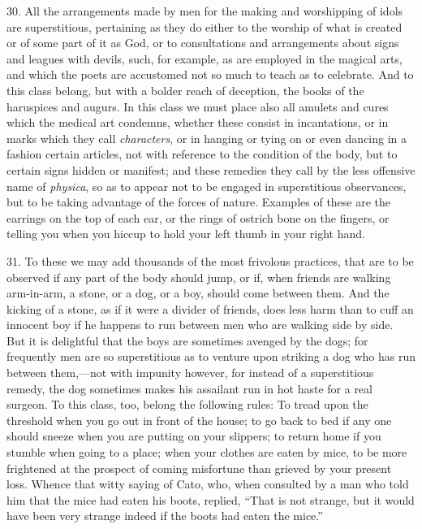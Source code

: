 30. All the arrangements made by men for the making and worshipping of idols are superstitious, pertaining as they do either to the worship of what is created or of some part of it as God, or to consultations and arrangements about signs and leagues with devils, such, for example, as are employed in the magical arts, and which the poets are accustomed not so much to teach as to celebrate. And to this class belong, but with a bolder reach of deception, the books of the haruspices and augurs. In this class we must place also all amulets and cures which the medical art condemns, whether these consist in incantations, or in marks which they call \emph{characters}, or in hanging or tying on or even dancing in a fashion certain articles, not with reference to the condition of the body, but to certain signs hidden or manifest; and these remedies they call by the less offensive name of \emph{physica}, so as to appear not to be engaged in superstitious observances, but to be taking advantage of the forces of nature. Examples of these are the earrings on the top of each ear, or the rings of ostrich bone on the fingers, or telling you when you hiccup to hold your left thumb in your right hand.

31. To these we may add thousands of the most frivolous practices, that are to be observed if any part of the body should jump, or if, when friends are walking arm-in-arm, a stone, or a dog, or a boy, should come between them. And the kicking of a stone, as if it were a divider of friends, does less harm than to cuff an innocent boy if he happens to run between men who are walking side by side. But it is delightful that the boys are sometimes avenged by the dogs; for frequently men are so superstitious as to venture upon striking a dog who has run between them,—not with impunity however, for instead of a superstitious remedy, the dog sometimes makes his assailant run in hot haste for a real surgeon. To this class, too, belong the following rules: To tread upon the threshold when you go out in front of the house; to go back to bed if any one should sneeze when you are putting on your slippers; to return home if you stumble when going to a place; when your clothes are eaten by mice, to be more frightened at the prospect of coming misfortune than grieved by your present loss. Whence that witty saying of Cato, who, when consulted by a man who told him that the mice had eaten his boots, replied, “That is not strange, but it would have been very strange indeed if the boots had eaten the mice.”


